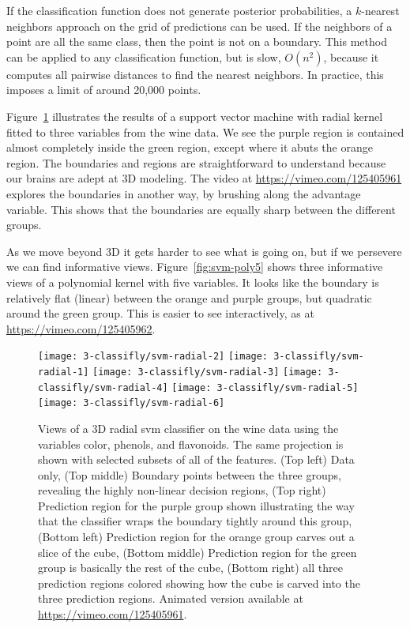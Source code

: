 \documentclass[preprint]{imsart}
\begin{document}
If the classification function does not generate posterior probabilities, a $k$-nearest neighbors approach on the grid of predictions can be used. If the neighbors of a point are all the same class, then the point is not on a boundary.  This method can be applied to any classification function, but is slow, $O(n^2)$, because it computes all pairwise distances to find the nearest neighbors.  In practice, this imposes a limit of around 20,000 points.

Figure~\ref{fig:svm-radial3} illustrates the results of a support vector machine \citep{cortes:1995} with radial kernel fitted to three variables from the wine data.  We see the purple region is contained almost completely inside the green region, except where it abuts the orange region. The boundaries and regions are straightforward to understand because our brains are adept at 3D modeling. The video at \url{https://vimeo.com/125405961} explores the boundaries in another way, by brushing along the advantage variable. This shows that the boundaries are equally sharp between the different groups.

As we move beyond 3D it gets harder to see what is going on, but if we persevere we can find informative views. Figure~\ref{fig:svm-poly5} shows three informative views of a polynomial kernel with five variables.  It looks like the boundary is relatively flat (linear) between the orange and purple groups, but quadratic around the green group.  This is easier to see interactively, as at \url{https://vimeo.com/125405962}.

\begin{figure}[htbp]
  \centering
    \texttt{[image: 3-classifly/svm-radial-2]}
    \texttt{[image: 3-classifly/svm-radial-1]}
    \texttt{[image: 3-classifly/svm-radial-3]}
    \texttt{[image: 3-classifly/svm-radial-4]}
    \texttt{[image: 3-classifly/svm-radial-5]}
    \texttt{[image: 3-classifly/svm-radial-6]}
  \caption{Views of a 3D radial {\sc svm} classifier on the wine data using the variables color, phenols, and flavonoids. The same projection is shown with selected subsets of all of the features. (Top left) Data only, (Top middle) Boundary points between the three groups, revealing the highly non-linear decision regions, (Top right) Prediction region for the purple group shown illustrating the way that the classifier wraps the boundary tightly around this group, (Bottom left) Prediction region for the orange group carves out a slice of the cube, (Bottom middle) Prediction region for the green group is basically the rest of the cube, (Bottom right) all three prediction regions colored showing how the cube is carved into the three prediction regions.  Animated version available at \url{https://vimeo.com/125405961}.}
  \label{fig:svm-radial3}
\end{figure}
\end{document}
